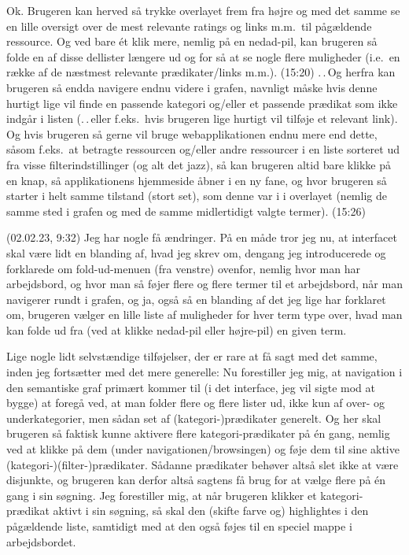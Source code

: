 \documentclass{report}
\begin{document}
Ok. Brugeren kan herved så trykke overlayet frem fra højre og med det samme se en lille oversigt over de mest relevante ratings og links m.m.\ til pågældende ressource. Og ved bare ét klik mere, nemlig på en nedad-pil, kan brugeren så folde en af disse dellister længere ud og for så at se nogle flere muligheder (i.e.\ en række af de næstmest relevante prædikater/links m.m.). (15:20) .\,.\,Og herfra kan brugeren så endda navigere endnu videre i grafen, navnligt måske hvis denne hurtigt lige vil finde en passende kategori og/eller et passende prædikat som ikke indgår i listen (.\,.\,eller f.eks.\ hvis brugeren lige hurtigt vil tilføje et relevant link). Og hvis brugeren så gerne vil bruge webapplikationen endnu mere end dette, såsom f.eks.\ at betragte ressourcen og/eller andre ressourcer i en liste sorteret ud fra visse filterindstillinger (og alt det jazz), så kan brugeren altid bare klikke på en knap, så applikationens hjemmeside åbner i en ny fane, og hvor brugeren så starter i helt samme tilstand (stort set), som denne var i i overlayet (nemlig de samme sted i grafen og med de samme midlertidigt valgte termer). (15:26)


(02.02.23, 9:32) Jeg har nogle få ændringer. På en måde tror jeg nu, at interfacet skal være lidt en blanding af, hvad jeg skrev om, dengang jeg introducerede og forklarede om fold-ud-menuen (fra venstre) ovenfor, nemlig hvor man har arbejdsbord, og hvor man så føjer flere og flere termer til et arbejdsbord, når man navigerer rundt i grafen, og ja, også så en blanding af det jeg lige har forklaret om, brugeren vælger en lille liste af muligheder for hver term type over, hvad man kan folde ud fra (ved at klikke nedad-pil eller højre-pil) en given term. 

Lige nogle lidt selvstændige tilføjelser, der er rare at få sagt med det samme, inden jeg fortsætter med det mere generelle: Nu forestiller jeg mig, at navigation i den semantiske graf primært kommer til (i det interface, jeg vil sigte mod at bygge) at foregå ved, at man folder flere og flere lister ud, ikke kun af over- og underkategorier, men sådan set af (kategori-)prædikater generelt. Og her skal brugeren så faktisk kunne aktivere flere kategori-prædikater på én gang, nemlig ved at klikke på dem (under navigationen/browsingen) og føje dem til sine aktive (kategori-)(filter-)prædikater. Sådanne prædikater behøver altså slet ikke at være disjunkte, og brugeren kan derfor altså sagtens få brug for at vælge flere på én gang i sin søgning. Jeg forestiller mig, at når brugeren klikker et kategori-prædikat aktivt i sin søgning, så skal den (skifte farve og) highlightes i den pågældende liste, samtidigt med at den også føjes til en speciel mappe i arbejdsbordet. 
\end{document}
